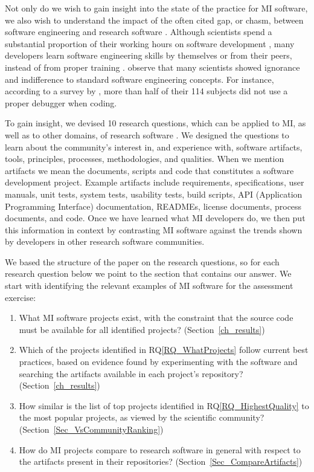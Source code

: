 \documentclass[11pt]{article}
\newcounter{rqnum} %
\newcommand{\rqref}[1]{RQ\ref{#1}}
\newcounter{qnum} %
\begin{document}
Not only do we wish to gain insight into the state of the practice for MI
software, we also wish to understand the impact of the often cited gap, or chasm,
between software engineering and research software \citep{Kelly2007,
Storer2017}. Although scientists spend a substantial proportion of their working
hours on software development \citep{Hannay2009, Prabhu2011}, many developers
learn software engineering skills by themselves or from their peers, instead of
from proper training \citep{Hannay2009}. \citet{Hannay2009} observe that many
scientists showed ignorance and indifference to standard software engineering
concepts. For instance, according to a survey by \citet{Prabhu2011}, more than
half of their 114 subjects did not use a proper debugger when coding.

To gain insight, we devised 10 research questions, which can be applied to MI,
as well as to other domains, of research software \citep{SmithEtAl2021,
SmithAndMichalski2022}.  We designed the questions to learn about the
community's interest in, and experience with, software artifacts, tools,
principles, processes, methodologies, and qualities.  When we mention artifacts
we mean the documents, scripts and code that constitutes a software development
project. Example artifacts include requirements, specifications, user manuals,
unit tests, system tests, usability tests, build scripts, API (Application
Programming Interface) documentation, READMEs, license documents, process
documents, and code.  Once we have learned what MI developers do, we then put
this information in context by contrasting MI software against the trends shown
by developers in other research software communities.

We based the structure of the paper on the research questions, so for each
research question below we point to the section that contains our answer.  We
start with identifying the relevant examples of MI software for the assessment
exercise:

\begin{enumerate}
	\item[RQ\refstepcounter{rqnum}\therqnum \label{RQ_WhatProjects}:] What MI
	software projects exist, with the constraint that the source code must be
	available for all identified projects? (Section~\ref{ch_results})
	\item [RQ\refstepcounter{rqnum}\therqnum \label{RQ_HighestQuality}:] Which
	of the projects identified in \rqref{RQ_WhatProjects} follow current best
	practices, based on evidence found by experimenting with the software and
	searching the artifacts available in each project's repository?
	(Section~\ref{ch_results})
	\item [RQ\refstepcounter{rqnum}\therqnum \label{RQ_CompareHQ2Popular}:] How
	similar is the list of top projects identified in \rqref{RQ_HighestQuality}
	to the most popular projects, as viewed by the scientific community?
	(Section~\ref{Sec_VsCommunityRanking})
    \item [RQ\refstepcounter{rqnum}\therqnum \label{RQ_CompareArtifacts}:] How
	do MI projects compare to research software in general with respect to the
	artifacts present in their repositories?
	(Section~\ref{Sec_CompareArtifacts})
\end{enumerate}
\end{document}
